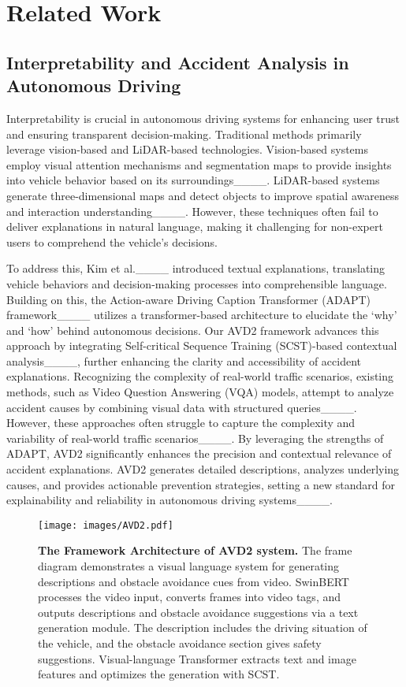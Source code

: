 \section{Related Work}
\subsection{Interpretability and Accident Analysis in Autonomous Driving}

Interpretability is crucial in autonomous driving systems for enhancing user trust and ensuring transparent decision-making. Traditional methods primarily leverage vision-based and LiDAR-based technologies. Vision-based systems employ visual attention mechanisms and segmentation maps to provide insights into vehicle behavior based on its surroundings____. LiDAR-based systems generate three-dimensional maps and detect objects to improve spatial awareness and interaction understanding____. However, these techniques often fail to deliver explanations in natural language, making it challenging for non-expert users to comprehend the vehicle's decisions.

To address this, Kim et al.____ introduced textual explanations, translating vehicle behaviors and decision-making processes into comprehensible language. Building on this, the Action-aware Driving Caption Transformer (ADAPT) framework____ utilizes a transformer-based architecture to elucidate the ‘why’ and ‘how’ behind autonomous decisions. Our AVD2 framework advances this approach by integrating Self-critical Sequence Training (SCST)-based contextual analysis____, further enhancing the clarity and accessibility of accident explanations. Recognizing the complexity of real-world traffic scenarios, existing methods, such as Video Question Answering (VQA) models, attempt to analyze accident causes by combining visual data with structured queries____. However, these approaches often struggle to capture the complexity and variability of real-world traffic scenarios____. By leveraging the strengths of ADAPT, AVD2 significantly enhances the precision and contextual relevance of accident explanations. AVD2 generates detailed descriptions, analyzes underlying causes, and provides actionable prevention strategies, setting a new standard for explainability and reliability in autonomous driving systems____.

\begin{figure*}[htbp]
\centering
\texttt{[image: images/AVD2.pdf]} %
\caption{\textbf{The Framework Architecture of AVD2 system.} {\footnotesize The frame diagram demonstrates a visual language system for generating descriptions and obstacle avoidance cues from video. SwinBERT processes the video input, converts frames into video tags, and outputs descriptions and obstacle avoidance suggestions via a text generation module. The description includes the driving situation of the vehicle, and the obstacle avoidance section gives safety suggestions. Visual-language Transformer extracts text and image features and optimizes the generation with SCST.}}
\label{fig:method}
\vspace{-1em}
\end{figure*}

